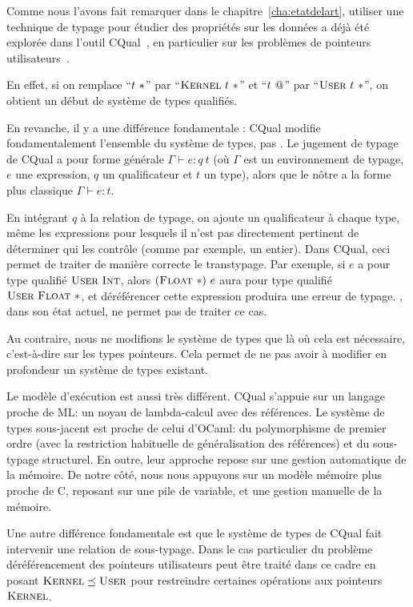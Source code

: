 Comme nous l'avons fait remarquer dans le chapitre~\ref{cha:etatdelart},
utiliser une technique de typage pour étudier des propriétés sur les données a
déjà été explorée dans l'outil CQual~\cite{pldi99}, en particulier sur les
problèmes de pointeurs utilisateurs~\cite{cquk-usenix04}.

En effet, si on remplace ``$t~*$'' par ``$\textsc{Kernel}~t~*$'' et ``$t~@$''
par ``$\textsc{User}~t~*$'', on obtient un début de système de types qualifiés.

En revanche, il y a une différence fondamentale : CQual modifie fondamentalement
l'ensemble du système de types, pas \langname. Le jugement de typage de CQual a
pour forme générale $Γ ⊢ e : q~t$ (où $Γ$ est un environnement de typage, $e$
une expression, $q$ un qualificateur et $t$ un type), alors que le nôtre a la
forme plus classique $Γ ⊢ e : t$.

En intégrant $q$ à la relation de typage, on ajoute un qualificateur à chaque
type, même les expressions pour lesquels il n'est pas directement pertinent de
déterminer qui les contrôle (comme par exemple, un entier). Dans CQual, ceci
permet de traiter de manière correcte le transtypage. Par exemple, si $e$ a pour
type qualifié $\textsc{User}~\textsc{Int}$, alors $(\textsc{Float}~*)~e$ aura pour type qualifié
$\textsc{User}~\textsc{Float}~*$, et déréférencer cette expression produira une erreur de
typage. \langname, dans son état actuel, ne permet pas de traiter ce cas.

Au contraire, nous ne modifions le système de types que là où cela est
nécessaire, c'est-à-dire sur les types pointeurs. Cela permet de ne pas avoir à
modifier en profondeur un système de types existant.

Le modèle d'exécution est aussi très différent. CQual s'appuie sur un
langage proche de ML: un noyau de lambda-calcul avec des références. Le système
de types sous-jacent est proche de celui d'OCaml: du polymorphisme de premier
ordre (avec la restriction habituelle de généralisation des références) et du
sous-typage structurel. En outre, leur approche repose sur une gestion
automatique de la mémoire. De notre côté, nous nous appuyons sur un modèle
mémoire plus proche de C, reposant sur une pile de variable, et une gestion
manuelle de la mémoire.

Une autre différence fondamentale est que le système de types de CQual fait
intervenir une relation de sous-typage. Dans le cas particulier du problème
déréférencement des pointeurs utilisateurs peut être traité dans ce cadre en
posant $\textsc{Kernel} \preceq \textsc{User}$ pour restreindre certaines opérations aux
pointeurs $\textsc{Kernel}$.

